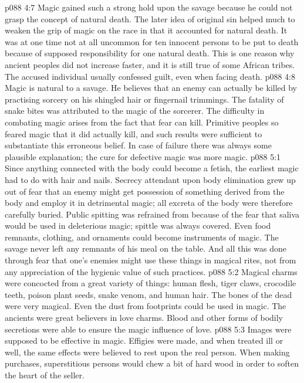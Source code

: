 \vs p088 4:7 Magic gained such a strong hold upon the savage because he could not grasp the concept of natural death. The later idea of original sin helped much to weaken the grip of magic on the race in that it accounted for natural death. It was at one time not at all uncommon for ten innocent persons to be put to death because of supposed responsibility for one natural death. This is one reason why ancient peoples did not increase faster, and it is still true of some African tribes. The accused individual usually confessed guilt, even when facing death.
\vs p088 4:8 Magic is natural to a savage. He believes that an enemy can actually be killed by practising sorcery on his shingled hair or fingernail trimmings. The fatality of snake bites was attributed to the magic of the sorcerer. The difficulty in combating magic arises from the fact that fear can kill. Primitive peoples so feared magic that it did actually kill, and such results were sufficient to substantiate this erroneous belief. In case of failure there was always some plausible explanation; the cure for defective magic was more magic.
\vs p088 5:1 Since anything connected with the body could become a fetish, the earliest magic had to do with hair and nails. Secrecy attendant upon body elimination grew up out of fear that an enemy might get possession of something derived from the body and employ it in detrimental magic; all excreta of the body were therefore carefully buried. Public spitting was refrained from because of the fear that saliva would be used in deleterious magic; spittle was always covered. Even food remnants, clothing, and ornaments could become instruments of magic. The savage never left any remnants of his meal on the table. And all this was done through fear that one’s enemies might use these things in magical rites, not from any appreciation of the hygienic value of such practices.
\vs p088 5:2 Magical charms were concocted from a great variety of things: human flesh, tiger claws, crocodile teeth, poison plant seeds, snake venom, and human hair. The bones of the dead were very magical. Even the dust from footprints could be used in magic. The ancients were great believers in love charms. Blood and other forms of bodily secretions were able to ensure the magic influence of love.
\vs p088 5:3 Images were supposed to be effective in magic. Effigies were made, and when treated ill or well, the same effects were believed to rest upon the real person. When making purchases, superstitious persons would chew a bit of hard wood in order to soften the heart of the seller.
